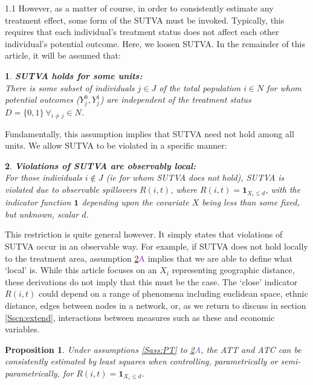 \documentclass{article}
\makeatletter
\newtheorem{proposition}{Proposition}
\newtheorem*{assumption*}{\assumptionnumber}
\providecommand{\assumptionnumber}{}
\newenvironment{assumption}[2]
 {%
  \renewcommand{\assumptionnumber}{Assumption #1{#2}}%
  \begin{assumption*}%
  \protected@edef\@currentlabel{#1}%
 }
 {%
  \end{assumption*}
 }
\newcommand{\asref}[2]{\ref{#1}{\textcolor{BlueViolet}{#2}}}
\makeatother
\begin{document}
\begin{spacing}{1.1}
However, as a matter of course, in order to consistently estimate any
treatment effect, some form of the SUTVA must be invoked.  Typically,
this requires that each individual's treatment status does not affect
each other individual's potential outcome.  Here, we loosen SUTVA. 
In the remainder of this article, it will be assumed that:
\begin{assumption}{3}{}
\label{Sass:SUTVAs}
\textbf{SUTVA holds for some units:} \\
There is some subset of individuals $j\in J$ of the total population $i\in N$ 
for whom potential outcomes ($Y_j^0, Y_j^1$) are independent of the treatment 
status $D=\{0,1\}\ \forall_{i\neq j} \in N$.
\end{assumption}
\noindent Fundamentally, this assumption implies that SUTVA need not hold among 
all units.  We allow SUTVA to be violated in a specific manner:
\begin{assumption}{4}{A}
\label{Sass:SUTVAl}
\textbf{Violations of SUTVA are observably local:} \\ 
For those individuals $i\notin J$ (ie for whom SUTVA does not hold), SUTVA is
violated due to observable spillovers $R(i,t)$, where 
$R(i,t)=\mathbf{1}_{X_i\leq d}$, with the indicator function $\mathbf{1}$
depending upon the covariate $X$ being less than some fixed, but unknown, 
scalar $d$.
\end{assumption}
\vspace{-4mm}
\noindent This restriction is quite general however.  It simply states that
violations of SUTVA occur in an observable way.  For example, if SUTVA does
not hold locally to the treatment area, assumption \asref{Sass:SUTVAl}{A} implies
that we are able to define what `local' is.  While this article focuses on
an $X_i$ representing geographic distance, these derivations do not imply that 
this must be the case.  The `close' indicator $R(i,t)$ could depend on a range 
of phenomena including euclidean space, ethnic distance, edges between
nodes in a network, or, as we return to discuss in section
\ref{Sscn:extend}, interactions between measures such as  these and
economic variables. 


\begin{proposition}
\label{Pass:ATT}
Under assumptions \ref{Sass:PT} to \asref{Sass:SUTVAl}{A}, the ATT and ATC can be 
consistently estimated by least squares when controlling, parametrically or
semi-parametrically, for $R(i,t)=\mathbf{1}_{X_i\leq d}$.
\end{proposition}



\end{spacing}
\end{document}
